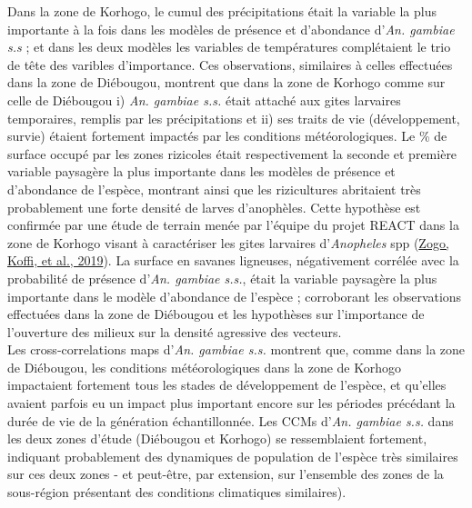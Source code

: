 \documentclass[12pt,twoside]{reedthesis}
\begin{document}
Dans la zone de Korhogo, le cumul des précipitations était la variable la plus importante à la fois dans les modèles de présence et d'abondance d'\emph{An. gambiae s.s} ; et dans les deux modèles les variables de températures complétaient le trio de tête des varibles d'importance. Ces observations, similaires à celles effectuées dans la zone de Diébougou, montrent que dans la zone de Korhogo comme sur celle de Diébougou i) \emph{An. gambiae s.s.} était attaché aux gites larvaires temporaires, remplis par les précipitations et ii) ses traits de vie (développement, survie) étaient fortement impactés par les conditions météorologiques. Le \% de surface occupé par les zones rizicoles était respectivement la seconde et première variable paysagère la plus importante dans les modèles de présence et d'abondance de l'espèce, montrant ainsi que les rizicultures abritaient très probablement une forte densité de larves d'anophèles. Cette hypothèse est confirmée par une étude de terrain menée par l'équipe du projet REACT dans la zone de Korhogo visant à caractériser les gites larvaires d'\emph{Anopheles} spp (\protect\hyperlink{ref-zogo_identification_2019}{Zogo, Koffi, et al., 2019}). La surface en savanes ligneuses, négativement corrélée avec la probabilité de présence d'\emph{An. gambiae s.s.}, était la variable paysagère la plus importante dans le modèle d'abondance de l'espèce ; corroborant les observations effectuées dans la zone de Diébougou et les hypothèses sur l'importance de l'ouverture des milieux sur la densité agressive des vecteurs.\\

Les cross-correlations maps d'\emph{An. gambiae s.s.} montrent que, comme dans la zone de Diébougou, les conditions météorologiques dans la zone de Korhogo impactaient fortement tous les stades de développement de l'espèce, et qu'elles avaient parfois eu un impact plus important encore sur les périodes précédant la durée de vie de la génération échantillonnée. Les CCMs d'\emph{An. gambiae s.s.} dans les deux zones d'étude (Diébougou et Korhogo) se ressemblaient fortement, indiquant probablement des dynamiques de population de l'espèce très similaires sur ces deux zones - et peut-être, par extension, sur l'ensemble des zones de la sous-région présentant des conditions climatiques similaires).\\
\end{document}
